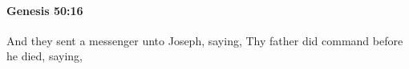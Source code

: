 
		\paragraph{Genesis 50:16} %
			\label{GENESIS-50-16}

			And they sent a messenger unto Joseph, saying, Thy father did command before he died, saying,



